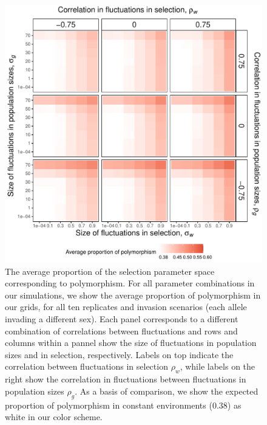 \begin{refsection}
\begin{figure}[H]
  \centerline{\includegraphics[width=1\textwidth]{figures/chapter4_fig1.pdf}}
  \caption[The average proportion of the selection parameter space corresponding to polymorphism.]{The average proportion of the selection parameter space corresponding to polymorphism. For all parameter combinations in our simulations, we show the average proportion of polymorphism in our grids, for all ten replicates and invasion scenarios (each allele invading a different sex). Each panel corresponds to a different combination of correlations between fluctuations and rows and columns within a pannel show the size of fluctuations in population sizes and in selection, respectively. Labels on top indicate the correlation between fluctuations in selection $\rho_{w}$, while labels on the right show the correlation in fluctuations between fluctuations in population sizes $\rho_{g}$.  As a basis of comparison, we show the expected proportion of polymorphism in constant environments ($ 0.38$) as white in our color scheme.  }
    \label{fig:heatmap}
\end{figure}



\end{refsection}
